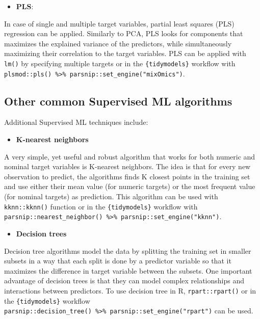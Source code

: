 \documentclass[
]{krantz}
\providecommand{\tightlist}{%
  \setlength{\itemsep}{0pt}\setlength{\parskip}{0pt}}
\begin{document}
\begin{itemize}
\tightlist
\item
  \textbf{PLS}:
\end{itemize}

In case of single and multiple target variables, partial least squares (PLS) regression can be applied. Similarly to PCA, PLS looks for components that maximizes the explained variance of the predictors, while simultaneously maximizing their correlation to the target variables. PLS can be applied with \texttt{lm()} by specifying multiple targets or in the \texttt{\{tidymodels\}} workflow with \texttt{plsmod::pls()\ \%\textgreater{}\%\ parsnip::set\_engine("mixOmics")}.

\hypertarget{other-common-supervised-ml-algorithms}{%
\subsection{Other common Supervised ML algorithms}\label{other-common-supervised-ml-algorithms}}

Additional Supervised ML techniques include:

\begin{itemize}
\tightlist
\item
  \textbf{K-nearest neighbors}
\end{itemize}

A very simple, yet useful and robust algorithm that works for both numeric and nominal target variables is K-nearest neighbors. The idea is that for every new observation to predict, the algorithms finds K closest points in the training set and use either their mean value (for numeric targets) or the most frequent value (for nominal targets) as prediction. This algorithm can be used with \texttt{kknn::kknn()} function or in the \texttt{\{tidymodels\}} workflow with \texttt{parsnip::nearest\_neighbor()\ \%\textgreater{}\%\ parsnip::set\_engine("kknn")}.

\begin{itemize}
\tightlist
\item
  \textbf{Decision trees}
\end{itemize}

Decision tree algorithms model the data by splitting the training set in smaller subsets in a way that each split is done by a predictor variable so that it maximizes the difference in target variable between the subsets. One important advantage of decision trees is that they can model complex relationships and interactions between predictors. To use decision tree in R, \texttt{rpart::rpart()} or in the \texttt{\{tidymodels\}} workflow \texttt{parsnip::decision\_tree()\ \%\textgreater{}\%\ parsnip::set\_engine("rpart")} can be used.
\end{document}
